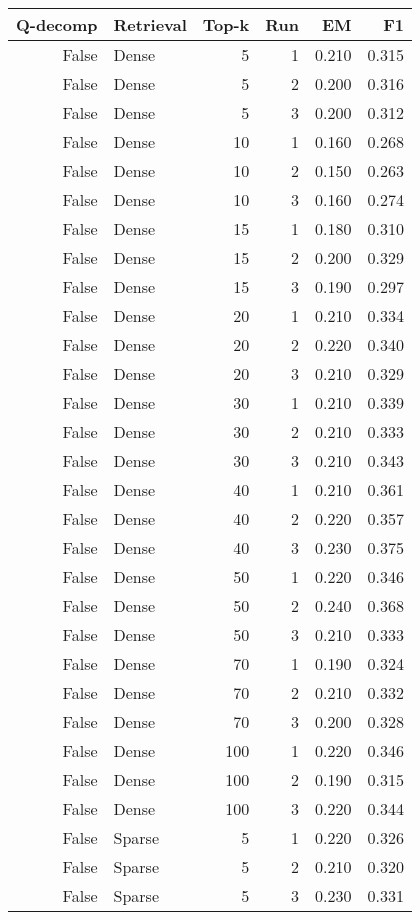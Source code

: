 \begin{tabular}{rlrrrr}
\toprule
Q-decomp & Retrieval & Top-k & Run & EM & F1 \\
\midrule
False & Dense & 5 & 1 & 0.210 & 0.315 \\
False & Dense & 5 & 2 & 0.200 & 0.316 \\
False & Dense & 5 & 3 & 0.200 & 0.312 \\
False & Dense & 10 & 1 & 0.160 & 0.268 \\
False & Dense & 10 & 2 & 0.150 & 0.263 \\
False & Dense & 10 & 3 & 0.160 & 0.274 \\
False & Dense & 15 & 1 & 0.180 & 0.310 \\
False & Dense & 15 & 2 & 0.200 & 0.329 \\
False & Dense & 15 & 3 & 0.190 & 0.297 \\
False & Dense & 20 & 1 & 0.210 & 0.334 \\
False & Dense & 20 & 2 & 0.220 & 0.340 \\
False & Dense & 20 & 3 & 0.210 & 0.329 \\
False & Dense & 30 & 1 & 0.210 & 0.339 \\
False & Dense & 30 & 2 & 0.210 & 0.333 \\
False & Dense & 30 & 3 & 0.210 & 0.343 \\
False & Dense & 40 & 1 & 0.210 & 0.361 \\
False & Dense & 40 & 2 & 0.220 & 0.357 \\
False & Dense & 40 & 3 & 0.230 & 0.375 \\
False & Dense & 50 & 1 & 0.220 & 0.346 \\
False & Dense & 50 & 2 & 0.240 & 0.368 \\
False & Dense & 50 & 3 & 0.210 & 0.333 \\
False & Dense & 70 & 1 & 0.190 & 0.324 \\
False & Dense & 70 & 2 & 0.210 & 0.332 \\
False & Dense & 70 & 3 & 0.200 & 0.328 \\
False & Dense & 100 & 1 & 0.220 & 0.346 \\
False & Dense & 100 & 2 & 0.190 & 0.315 \\
False & Dense & 100 & 3 & 0.220 & 0.344 \\
False & Sparse & 5 & 1 & 0.220 & 0.326 \\
False & Sparse & 5 & 2 & 0.210 & 0.320 \\
False & Sparse & 5 & 3 & 0.230 & 0.331 \\

\end{tabular}
